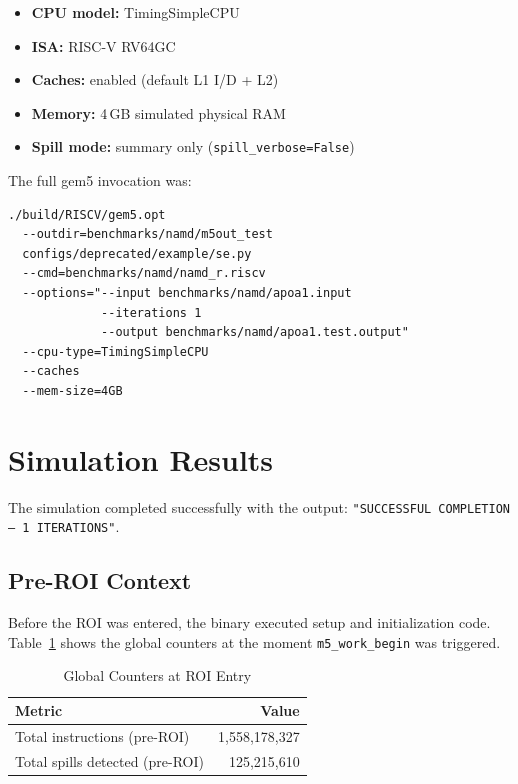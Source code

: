 \documentclass[conference]{IEEEtran}
\begin{document}
\begin{itemize}
    \item \textbf{CPU model:}   TimingSimpleCPU
    \item \textbf{ISA:}         RISC-V RV64GC
    \item \textbf{Caches:}      enabled (default L1 I/D + L2)
    \item \textbf{Memory:}      4\,GB simulated physical RAM
    \item \textbf{Spill mode:}  summary only (\texttt{spill\_verbose=False})
\end{itemize}

The full gem5 invocation was:

\begin{verbatim}
./build/RISCV/gem5.opt
  --outdir=benchmarks/namd/m5out_test
  configs/deprecated/example/se.py
  --cmd=benchmarks/namd/namd_r.riscv
  --options="--input benchmarks/namd/apoa1.input
             --iterations 1
             --output benchmarks/namd/apoa1.test.output"
  --cpu-type=TimingSimpleCPU
  --caches
  --mem-size=4GB
\end{verbatim}

\section{Simulation Results}

The simulation completed successfully with the output:
\texttt{"SUCCESSFUL COMPLETION — 1 ITERATIONS"}.

\subsection{Pre-ROI Context}

Before the ROI was entered, the binary executed setup and
initialization code. Table~\ref{tab:preroi} shows the global
counters at the moment \texttt{m5\_work\_begin} was triggered.

\begin{table}[H]
\centering
\caption{Global Counters at ROI Entry}
\label{tab:preroi}
\begin{tabular}{lr}
\toprule
\textbf{Metric} & \textbf{Value} \\
\midrule
Total instructions (pre-ROI) & 1,558,178,327 \\
Total spills detected (pre-ROI) & 125,215,610 \\
\bottomrule
\end{tabular}
\end{table}
\end{document}
